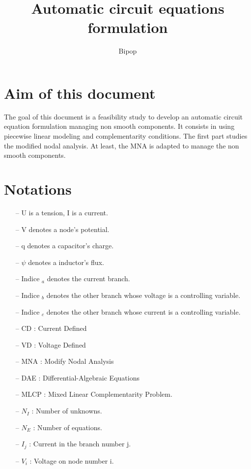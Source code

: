 \documentclass[10pt]{article}
\begin{document}
 \title{Automatic circuit equations formulation}
\author{Bipop}
\maketitle

\newpage
\tableofcontents
 \newpage
 \section{Aim of this document}
 The goal of this document is a feasibility study to develop an automatic circuit equation
 formulation managing non smooth components. It consists in using piecewise linear modeling
 and complementarity conditions. The first part studies the modified nodal analysis. At least, the
 MNA is adapted to manage the non smooth components.
 \section{Notations}
\begin{itemize}
  \item[--] U is a tension, I is a current.
  \item[--] V denotes a node's potential.
  \item[--] q denotes a capacitor's charge.
  \item[--] $\psi$ denotes a inductor's flux.
  \item[--] Indice $_{a}$ denotes the current branch.
  \item[--] Indice $_{b}$ denotes the other branch whose voltage is a controlling variable.
  \item[--] Indice $_{c}$ denotes the other branch whose current is a controlling variable.
\item[--] CD : Current Defined
\item[--] VD : Voltage Defined
\item[--] MNA : Modify Nodal Analysis
\item[--] DAE : Differential-Algebraic Equations
\item[--] MLCP : Mixed Linear Complementarity Problem.
\item[--] $N_{I}$ : Number of unknowns.
\item[--] $N_{E}$ : Number of equations.
\item[--] $I_{j}$ : Current in the branch number j.
\item[--] $V_{i}$ : Voltage on node number i. 
\end{itemize}


\end{document}
